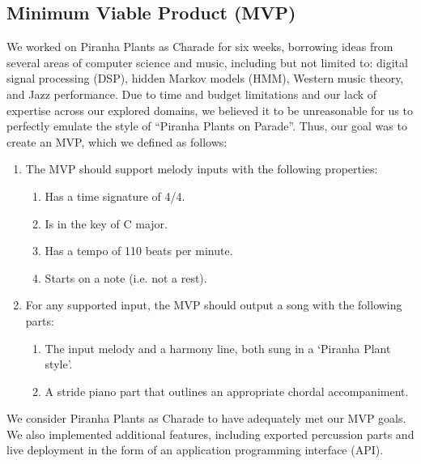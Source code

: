 \subsection{Minimum Viable Product (MVP)}

We worked on Piranha Plants as Charade for six weeks, borrowing ideas from several areas of computer science and music, including but not limited to: digital signal processing (DSP), hidden Markov models (HMM), Western music theory, and Jazz performance. Due to time and budget limitations and our lack of expertise across our explored domains, we believed it to be unreasonable for us to perfectly emulate the style of ``Piranha Plants on Parade''. Thus, our goal was to create an MVP, which we defined as follows:
\begin{enumerate}
    \item The MVP should support melody inputs with the following properties:
    \begin{enumerate}
        \item Has a time signature of 4/4.
        \item Is in the key of C major.
        \item Has a tempo of 110 beats per minute.
        \item Starts on a note (i.e. not a rest).
    \end{enumerate}
    \item For any supported input, the MVP should output a song with the following parts:
    \begin{enumerate}
        \item The input melody and a harmony line, both sung in a `Piranha Plant style'.
        \item A stride piano part that outlines an appropriate chordal accompaniment.
    \end{enumerate}
\end{enumerate}

We consider Piranha Plants as Charade to have adequately met our MVP goals. We also implemented additional features, including exported percussion parts and live deployment in the form of an application programming interface (API).
